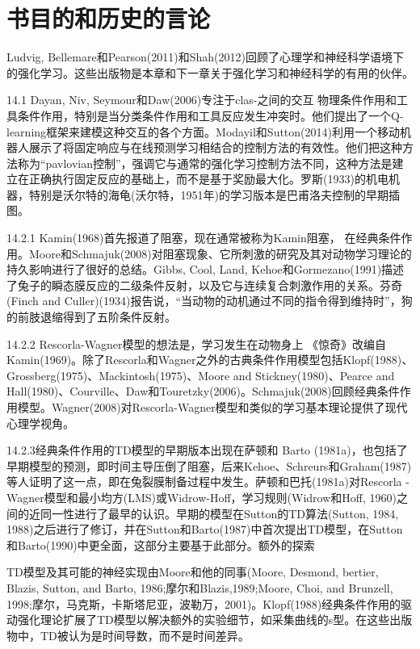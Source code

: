 \section{书目的和历史的言论}

Ludvig, Bellemare和Pearson(2011)和Shah(2012)回顾了心理学和神经科学语境下的强化学习。这些出版物是本章和下一章关于强化学习和神经科学的有用的伙伴。

14.1 Dayan, Niv, Seymour和Daw(2006)专注于clas-之间的交互
物理条件作用和工具条件作用，特别是当分类条件作用和工具反应发生冲突时。他们提出了一个Q-learning框架来建模这种交互的各个方面。Modayil和Sutton(2014)利用一个移动机器人展示了将固定响应与在线预测学习相结合的控制方法的有效性。他们把这种方法称为“pavlovian控制”，强调它与通常的强化学习控制方法不同，这种方法是建立在正确执行固定反应的基础上，而不是基于奖励最大化。罗斯(1933)的机电机器，特别是沃尔特的海龟(沃尔特，1951年)的学习版本是巴甫洛夫控制的早期插图。

14.2.1 Kamin(1968)首先报道了阻塞，现在通常被称为Kamin阻塞，
在经典条件作用。Moore和Schmajuk(2008)对阻塞现象、它所刺激的研究及其对动物学习理论的持久影响进行了很好的总结。Gibbs, Cool, Land, Kehoe和Gormezano(1991)描述了兔子的瞬态膜反应的二级条件反射，以及它与连续复合刺激作用的关系。芬奇(Finch and Culler)(1934)报告说，“当动物的动机通过不同的指令得到维持时”，狗的前肢退缩得到了五阶条件反射。

14.2.2 Rescorla-Wagner模型的想法是，学习发生在动物身上
《惊奇》改编自Kamin(1969)。除了Rescorla和Wagner之外的古典条件作用模型包括Klopf(1988)、Grossberg(1975)、Mackintosh(1975)、Moore and Stickney(1980)、Pearce and Hall(1980)、Courville、Daw和Touretzky(2006)。Schmajuk(2008)回顾经典条件作用模型。Wagner(2008)对Rescorla-Wagner模型和类似的学习基本理论提供了现代心理学视角。

14.2.3经典条件作用的TD模型的早期版本出现在萨顿和
Barto (1981a)，也包括了早期模型的预测，即时间主导压倒了阻塞，后来Kehoe、Schreurs和Graham(1987)等人证明了这一点，即在兔裂膜制备过程中发生。萨顿和巴托(1981a)对Rescorla - Wagner模型和最小均方(LMS)或Widrow-Hoff，学习规则(Widrow和Hoff, 1960)之间的近同一性进行了最早的认识。早期的模型在Sutton的TD算法(Sutton, 1984, 1988)之后进行了修订，并在Sutton和Barto(1987)中首次提出TD模型，在Sutton和Barto(1990)中更全面，这部分主要基于此部分。额外的探索

TD模型及其可能的神经实现由Moore和他的同事(Moore, Desmond, bertier, Blazis, Sutton, and Barto, 1986;摩尔和Blazis,1989;Moore, Choi, and Brunzell, 1998;摩尔，马克斯，卡斯塔尼亚，波勒万，2001)。Klopf(1988)经典条件作用的驱动强化理论扩展了TD模型以解决额外的实验细节，如采集曲线的s型。在这些出版物中，TD被认为是时间导数，而不是时间差异。

